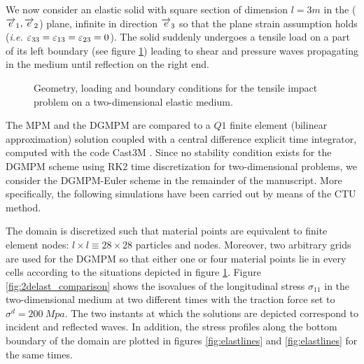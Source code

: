 We now consider an elastic solid with square section of dimension $l=3m$ in the (${\overrightarrow{e}}_1,{\overrightarrow{e}}_2$) plane, infinite in direction ${\overrightarrow{e}}_3$ so that the plane strain assumption holds (\textit{i.e. $\varepsilon_{33}=\varepsilon_{13}=\varepsilon_{23}=0$}). The solid suddenly undergoes a tensile load on a part of its left boundary (see figure \ref{fig:2D_planeStrain}) leading to shear and pressure waves propagating in the medium until reflection on the right end.
\begin{figure}[h!]
  \centering
   \qquad
  \caption{Geometry, loading and boundary conditions for the tensile impact problem on a two-dimensional elastic medium.}
  \label{fig:2D_planeStrain}
\end{figure}
The MPM and the DGMPM are compared to a $Q1$ finite element (bilinear approximation) solution coupled with a central difference explicit time integrator, computed with the code Cast3M \cite{Castem}.
Since no stability condition exists for the DGMPM scheme using RK2 time discretization for two-dimensional problems, we consider the DGMPM-Euler scheme in the remainder of the manuscript.
More specifically, the following simulations have been carried out by means of the CTU method.

The domain is discretized such that material points are equivalent to finite element nodes: $l\times l \equiv 28 \times 28$ particles and nodes. Moreover, two arbitrary grids are used for the DGMPM so that either one or four material points lie in every cells according to the situations depicted in figure \ref{fig:2D_planeStrain}.
Figure \ref{fig:2delast_comparison} shows the isovalues of the longitudinal stress $\sigma_{11}$ in the two-dimensional medium at two different times with the traction force set to $\sigma^d=200\: Mpa$.
The two instants at which the solutions are depicted correspond to incident and reflected waves. In addition, the stress profiles along the bottom boundary of the domain are plotted in figures \ref{fig:elastlines} and \ref{fig:elastlines} for the same times.

